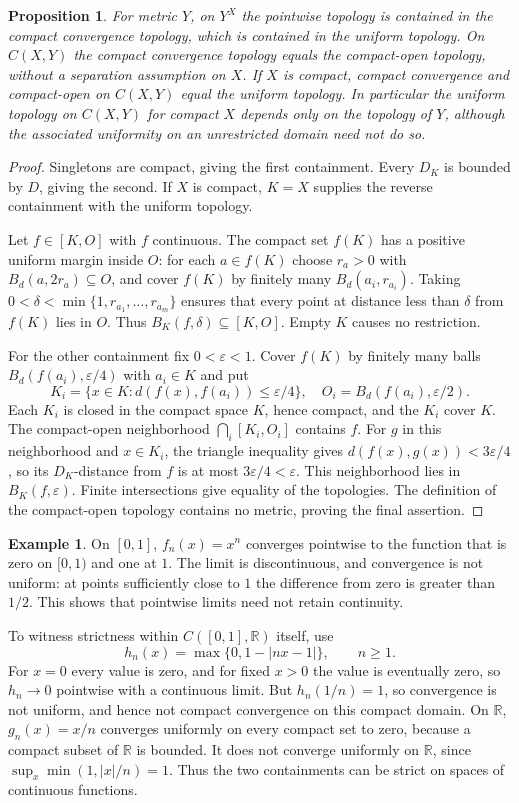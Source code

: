 \documentclass[11pt,oneside,openany]{book}
\newtheorem{proposition}[theorem]{Proposition}
\theoremstyle{definition}
\newtheorem{example}[theorem]{Example}
\theoremstyle{remark}
\newcommand{\R}{\mathbb R}\newcommand{\C}{\mathbb C}
\newcommand{\eps}{\varepsilon}
\begin{document}
\begin{proposition}\label{d10:13:topology-comparison}
For metric $Y$, on $Y^X$ the pointwise topology is contained in the compact convergence topology, which is contained in the uniform topology. On $C(X,Y)$ the compact convergence topology equals the compact-open topology, without a separation assumption on $X$. If $X$ is compact, compact convergence and compact-open on $C(X,Y)$ equal the uniform topology. In particular the uniform topology on $C(X,Y)$ for compact $X$ depends only on the topology of $Y$, although the associated uniformity on an unrestricted domain need not do so.
\end{proposition}
\begin{proof}
Singletons are compact, giving the first containment. Every $D_K$ is bounded by $D$, giving the second. If $X$ is compact, $K=X$ supplies the reverse containment with the uniform topology.

Let $f\in[K,O]$ with $f$ continuous. The compact set $f(K)$ has a positive uniform margin inside $O$: for each $a\in f(K)$ choose $r_a>0$ with $B_d(a,2r_a)\subseteq O$, and cover $f(K)$ by finitely many $B_d(a_i,r_{a_i})$. Taking $0<\delta<\min\{1,r_{a_1},\ldots,r_{a_m}\}$ ensures that every point at distance less than $\delta$ from $f(K)$ lies in $O$. Thus $B_K(f,\delta)\subseteq[K,O]$. Empty $K$ causes no restriction.

For the other containment fix $0<\eps<1$. Cover $f(K)$ by finitely many balls $B_d(f(a_i),\eps/4)$ with $a_i\in K$ and put
\[
 K_i=\{x\in K:d(f(x),f(a_i))\leq\eps/4\},\quad
 O_i=B_d(f(a_i),\eps/2).
\]
Each $K_i$ is closed in the compact space $K$, hence compact, and the $K_i$ cover $K$. The compact-open neighborhood $\bigcap_i[K_i,O_i]$ contains $f$. For $g$ in this neighborhood and $x\in K_i$, the triangle inequality gives $d(f(x),g(x))<3\eps/4$, so its $D_K$-distance from $f$ is at most $3\eps/4<\eps$. This neighborhood lies in $B_K(f,\eps)$. Finite intersections give equality of the topologies. The definition of the compact-open topology contains no metric, proving the final assertion.
\end{proof}

\begin{example}\label{d10:13:strict-comparisons}
On $[0,1]$, $f_n(x)=x^n$ converges pointwise to the function that is zero on $[0,1)$ and one at $1$. The limit is discontinuous, and convergence is not uniform: at points sufficiently close to $1$ the difference from zero is greater than $1/2$. This shows that pointwise limits need not retain continuity.

To witness strictness within $C([0,1],\R)$ itself, use
\[
 h_n(x)=\max\{0,1-|nx-1|\},\qquad n\geq1.
\]
For $x=0$ every value is zero, and for fixed $x>0$ the value is eventually zero, so $h_n\to0$ pointwise with a continuous limit. But $h_n(1/n)=1$, so convergence is not uniform, and hence not compact convergence on this compact domain. On $\R$, $g_n(x)=x/n$ converges uniformly on every compact set to zero, because a compact subset of $\R$ is bounded. It does not converge uniformly on $\R$, since $\sup_x\min(1,|x|/n)=1$. Thus the two containments can be strict on spaces of continuous functions.
\end{example}
\end{document}
